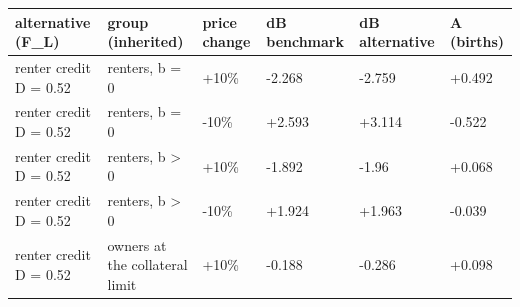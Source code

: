 \begingroup\small
\setlength{\tabcolsep}{3pt}
\renewcommand{\arraystretch}{1.04}
\begin{tabularx}{\linewidth}{XXXXXX}
\toprule
alternative (F\_L) & group (inherited) & price change & dB benchmark & dB alternative & A (births) \\
\midrule
renter credit D = 0.52 & renters, b = 0 & +10\% & -2.268 & -2.759 & +0.492 \\
renter credit D = 0.52 & renters, b = 0 & -10\% & +2.593 & +3.114 & -0.522 \\
renter credit D = 0.52 & renters, b \textgreater{} 0 & +10\% & -1.892 & -1.96 & +0.068 \\
renter credit D = 0.52 & renters, b \textgreater{} 0 & -10\% & +1.924 & +1.963 & -0.039 \\
renter credit D = 0.52 & owners at the collateral limit & +10\% & -0.188 & -0.286 & +0.098 \\
\bottomrule
\end{tabularx}
\endgroup
